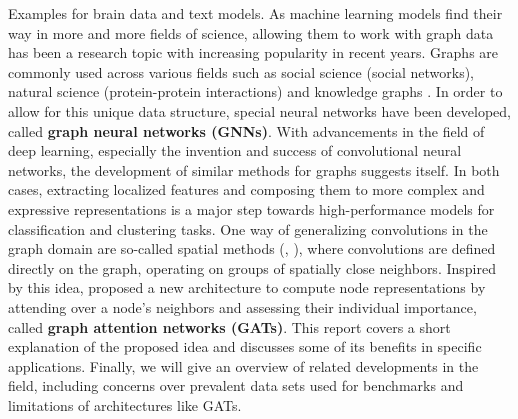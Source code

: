 \label{chapter:applications}

Examples for brain data and text models.
As machine learning models find their way in more and more fields of science, allowing them to work with graph data has been a research topic with increasing popularity in recent years. Graphs are commonly used across various fields such as social science (social networks), natural science (protein-protein interactions) and knowledge graphs \cite{zhou2021graph}. In order to allow for this unique data structure, special neural networks have been developed, called \textbf{graph neural networks (GNNs)}. With advancements in the field of deep learning, especially the invention and success of convolutional neural networks, the development of similar methods for graphs suggests itself. In both cases, extracting localized features and composing them to more complex and expressive representations is a major step towards high-performance models for classification and clustering tasks. One way of generalizing convolutions in the graph domain are so-called spatial methods (\cite{hamilton2018inductive}, \cite{monti2016geometric}), where convolutions are defined directly on the graph, operating on groups of spatially close neighbors. Inspired by this idea, \cite{velickovic2018graph} proposed a new architecture to compute node representations by attending over a node's neighbors and assessing their individual importance, called \textbf{graph attention networks (GATs)}. This report covers a short explanation of the proposed idea and discusses some of its benefits in specific applications. Finally, we will give an overview of related developments in the field, including concerns over prevalent data sets used for benchmarks and limitations of architectures like GATs.